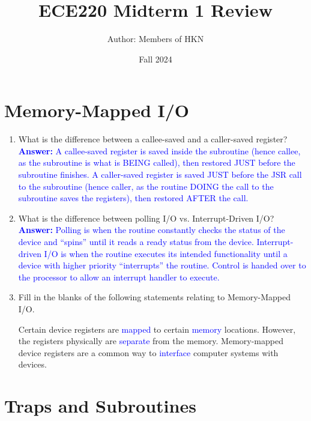 \documentclass{article}
\title{ECE220 Midterm 1 Review}
\author{Author: Members of HKN}
\date{Fall 2024}
\begin{document}
\maketitle

\section {
Memory-Mapped I/O
}


\begin{enumerate}[label=(\alph*)]
    \item What is the difference between a callee-saved and a caller-saved register?
    \newline
    \textcolor{blue}{\textbf{Answer:} A callee-saved register is saved inside the subroutine (hence callee, as the subroutine is what is BEING called), then restored JUST before the subroutine finishes. A caller-saved register is saved JUST before the JSR call to the subroutine (hence caller, as the routine DOING the call to the subroutine saves the registers), then restored AFTER the call. }
   

    \item What is the difference between polling I/O vs. Interrupt-Driven I/O?
    \newline
    \textcolor{blue}{\textbf{Answer:} Polling is when the routine constantly checks the status of the device and “spins” until it reads a ready status from the device. Interrupt-driven I/O is when the routine executes its intended functionality until a device with higher priority “interrupts” the routine. Control is handed over to the processor to allow an interrupt handler to execute.}

    \item Fill in the blanks of the following statements relating to Memory-Mapped I/O.

    Certain device registers are \textcolor{blue}{mapped} to certain \textcolor{blue}{memory} locations. However, the registers physically are \textcolor{blue}{separate} from the memory. Memory-mapped device registers are a common way to \textcolor{blue}{interface} computer systems with devices.

    

    
\end{enumerate}


\section{
    Traps and Subroutines
}
\end{document}
